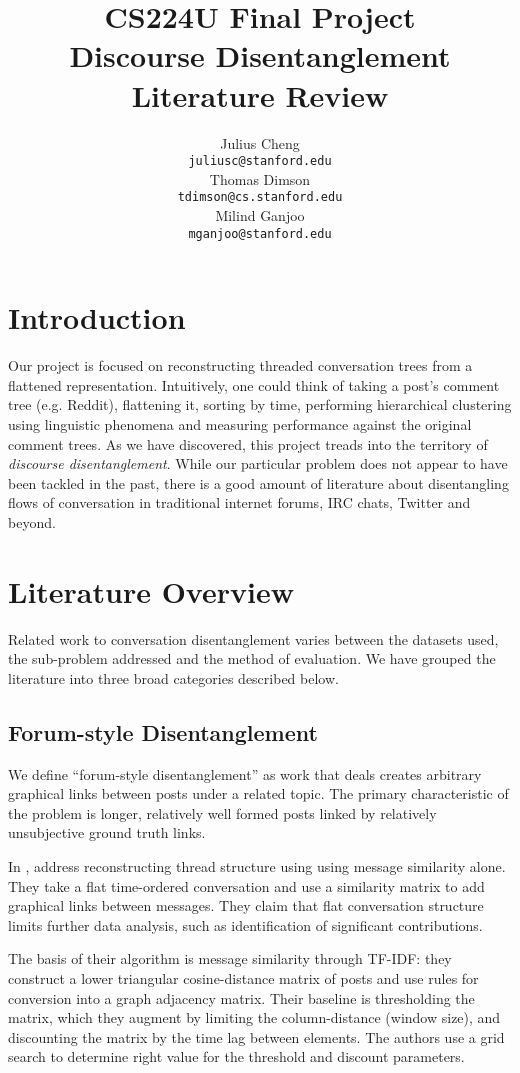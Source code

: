 \documentclass[11pt]{article}
\title{{\small CS224U Final Project} \\ Discourse Disentanglement \\Literature Review}
\author{Julius Cheng \\
  {\tt juliusc@stanford.edu}
  \\\And
  Thomas Dimson  \\
  {\tt tdimson@cs.stanford.edu}
  \\\AND
  Milind Ganjoo \\
  {\tt mganjoo@stanford.edu}
}
\date{}
\begin{document}
\maketitle

\section{Introduction}
Our project is focused on reconstructing threaded conversation trees
from a flattened representation. Intuitively, one could think of 
taking a post's comment tree (e.g. Reddit), flattening it, sorting by time, performing
hierarchical clustering using linguistic phenomena and measuring performance 
against the original comment trees. As we have
discovered, this project treads into the territory of \textit{discourse disentanglement}.
While our particular problem does not appear to have been tackled in the past,
there is a good amount of literature about disentangling flows of conversation
in traditional internet forums, IRC chats, Twitter and beyond.

\section{Literature Overview}
Related work to conversation disentanglement varies between the datasets used, the 
sub-problem addressed and the method of evaluation. We have grouped the literature into
three broad categories described below.

\subsection{Forum-style Disentanglement}
\label{sec:threaded}
We define ``forum-style disentanglement'' as work that deals creates arbitrary
graphical links between posts under a related topic. The primary characteristic of the problem 
is longer, relatively well formed posts linked by relatively unsubjective ground truth links.

In \cite{Wang2008a}, address reconstructing thread structure using using 
message similarity alone. They take a flat
time-ordered conversation and use a similarity matrix to add graphical
links between messages. They claim that flat conversation structure
limits further data analysis, such as identification of significant
contributions. 

The basis of their algorithm is message similarity through TF-IDF: they
construct a lower triangular cosine-distance matrix of posts and use rules 
for conversion into a graph adjacency matrix. Their baseline is thresholding the
matrix, which they augment by limiting the column-distance (window size), and discounting
the matrix by the time lag between elements. The authors use a grid search to
determine right value for the threshold and discount parameters.
\end{document}
